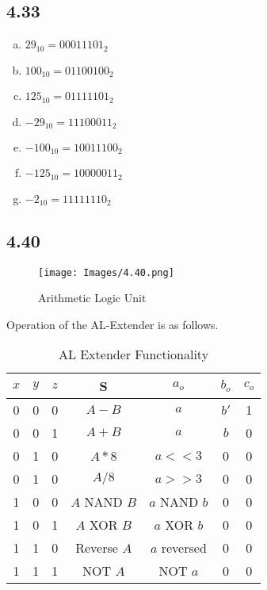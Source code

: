 \subsection*{4.33}
\begin{enumerate}[(a)]
    \item $29_{10}=00011101_2$
    \item $100_{10}=01100100_2$
    \item $125_{10}=01111101_2$
    \item $-29_{10}=11100011_2$
    \item $-100_{10}=10011100_2$
    \item $-125_{10}=10000011_2$
    \item $-2_{10}=11111110_2$
\end{enumerate}

\clearpage
\subsection*{4.40}
\begin{figure}[!ht]
    \centering
    \texttt{[image: Images/4.40.png]}
    \caption{Arithmetic Logic Unit}
\end{figure}

\noindent
Operation of the AL-Extender is as follows.\\
\begin{table}[!ht]
    \centering
    \begin{tabular}{|c|c|c|c|c|c|c|}
    \hline
    $x$ & $y$ & $z$ & S             & $a_o$        & $b_o$ & $c_o$ \\ \hline
    0   & 0   & 0   & $A-B$         & $a$          & $b'$  & 1      \\ \hline
    0   & 0   & 1   & $A+B$         & $a$          & $b$   & 0      \\ \hline
    0   & 1   & 0   & $A*8$         & $a<<3$       & 0     & 0      \\ \hline
    0   & 1   & 0   & $A/8$         & $a>>3$       & 0     & 0      \\ \hline
    1   & 0   & 0   & $A$ NAND $B$  & $a$ NAND $b$ & 0     & 0      \\ \hline
    1   & 0   & 1   & $A$ XOR $B$   & $a$ XOR $b$  & 0     & 0      \\ \hline
    1   & 1   & 0   & Reverse $A$   & $a$ reversed & 0     & 0      \\ \hline
    1   & 1   & 1   & NOT $A$       & NOT $a$      & 0     & 0      \\ \hline
    \end{tabular}
    \caption{AL Extender Functionality}
    \label{tab:my_label}
\end{table}

